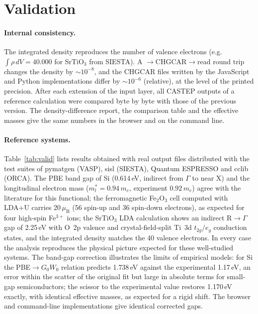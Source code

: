 \section{Validation}\label{sec:valid}
\paragraph{Internal consistency.} The integrated density reproduces the number of valence electrons (e.g.\ $\int\rho\,dV=40.000$ for SrTiO$_3$ from SIESTA). A $\to$CHGCAR$\to$read round trip changes the density by $\sim10^{-8}$, and the CHGCAR files written by the JavaScript and Python implementations differ by $\sim10^{-6}$ (relative), at the level of the printed precision. After each extension of the input layer, all CASTEP outputs of a reference calculation were compared byte by byte with those of the previous version. The density-difference report, the comparison table and the effective masses give the same numbers in the browser and on the command line.

\paragraph{Reference systems.} Table~\ref{tab:valid} lists results obtained with real output files distributed with the test suites of pymatgen (VASP), sisl (SIESTA), Quantum ESPRESSO and cclib (ORCA). The PBE band gap of Si (0.614\,eV, indirect from $\Gamma$ to near X) and the longitudinal electron mass ($m^*_l=0.94\,m_e$, experiment $0.92\,m_e$) agree with the literature for this functional; the ferromagnetic Fe$_2$O$_3$ cell computed with LDA+U carries 20\,$\mu_\mathrm B$ (56 spin-up and 36 spin-down electrons), as expected for four high-spin Fe$^{3+}$ ions; the SrTiO$_3$ LDA calculation shows an indirect R$\to\Gamma$ gap of 2.25\,eV with O~2p valence and crystal-field-split Ti~3d $t_{2g}/e_g$ conduction states, and the integrated density matches the 40 valence electrons. In every case the analysis reproduces the physical picture expected for these well-studied systems. The band-gap correction illustrates the limits of empirical models: for Si the PBE$\to G_0W_0$ relation predicts 1.738\,eV against the experimental 1.17\,eV, an error within the scatter of the original fit but large in absolute terms for small-gap semiconductors; the scissor to the experimental value restores 1.170\,eV exactly, with identical effective masses, as expected for a rigid shift. The browser and command-line implementations give identical corrected gaps.

